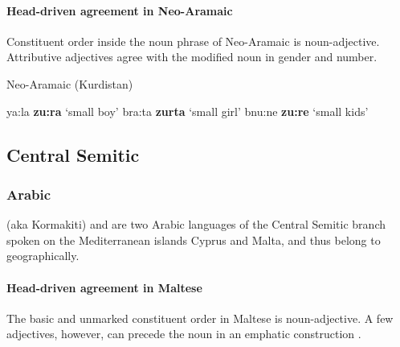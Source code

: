 \paragraph*{Head\hyp{}driven agreement in Neo-Aramaic}
Constituent order inside the noun phrase of Neo-Aramaic is noun-adjective. Attributive adjectives agree with the modified noun in gender and number.
\begin{exe}
\ex \rm{Neo-Aramaic (Kurdistan) \citep{krotkoff1982}}
\begin{xlist}
\ex	ya:la \textbf{zu:ra}	\rm{‘small boy’}
\ex	bra:ta \textbf{zurta}	\rm{‘small girl’}
\ex	bnu:ne \textbf{zu:re}	\rm{‘small kids’}
\end{xlist}
\end{exe}

\subsection{Central Semitic}		
\subsubsection{Arabic}
 (aka Kormakiti) and  are two Arabic languages of the Central Semitic branch spoken on the Mediterranean islands Cyprus and Malta, and thus belong to  geographically.

\paragraph*{Head\hyp{}driven agreement in Maltese}
The basic and unmarked constituent order in Maltese is noun-adjective. A few adjectives, however, can precede the noun in an emphatic construction \citep[71]{borg-etal1996}.

